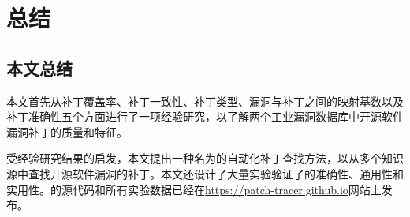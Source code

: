\chapter{总结}


\section{本文总结}
本文首先从补丁覆盖率、补丁一致性、补丁类型、漏洞与补丁之间的映射基数以及补丁准确性五个方面进行了一项经验研究，以了解两个工业漏洞数据库中开源软件漏洞补丁的质量和特征。

受经验研究结果的启发，本文提出一种名为\tool 的自动化补丁查找方法，以从多个知识源中查找开源软件漏洞的补丁。本文还设计了大量实验验证了\tool 的准确性、通用性和实用性。\tool 的源代码和所有实验数据已经在\url{https://patch-tracer.github.io}网站上发布。


